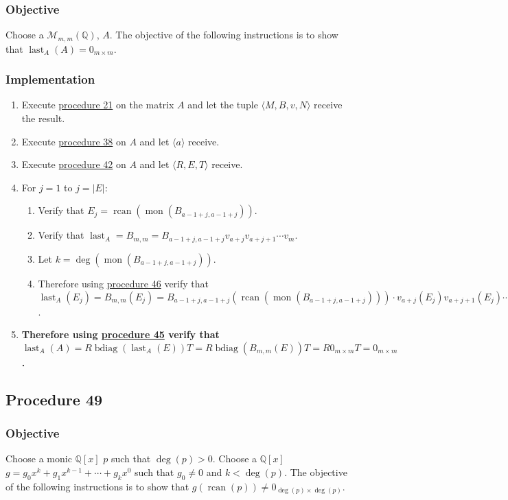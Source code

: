 \documentclass[twocolumn]{article}
\DeclareMathOperator{\bdiag}{bdiag}
\DeclareMathOperator{\rcan}{rcan}
\DeclareMathOperator{\mon}{mon}
\DeclareMathOperator{\last}{last}
\begin{document}
			\subsubsection{Objective}
				Choose a $\mathcal{M}_{m,m}(\mathbb{Q})$, $A$. The objective of the following instructions is to show that $\last_A(A)=0_{m\times m}$.
			\subsubsection{Implementation}
				\begin{enumerate}
					\item Execute \hyperref[sec:procedure 21]{procedure 21} on the matrix $A$ and let the tuple $\langle M,B,v,N\rangle$ receive the result.
					\item Execute \hyperref[sec:procedure 38]{procedure 38} on $A$ and let $\langle a\rangle$ receive.
					\item Execute \hyperref[sec:procedure 42]{procedure 42} on $A$ and let $\langle R,E,T\rangle$ receive.
					\item For $j=1$ to $j=\lvert E\rvert$:
					\begin{enumerate}
						\item Verify that $E_j=\rcan(\mon(B_{a-1+j,a-1+j}))$.
						\item Verify that $\last_A=B_{m,m}=B_{a-1+j,a-1+j}v_{a+j}v_{a+j+1}\cdots v_m$.
						\item Let $k=\deg(\mon(B_{a-1+j,a-1+j}))$.
						\item Therefore using \hyperref[sec:procedure 46]{procedure 46} verify that $\last_A(E_j)=B_{m,m}(E_j)=B_{a-1+j,a-1+j}(\rcan(\mon(B_{a-1+j,a-1+j})))\cdot v_{a+j}(E_j)v_{a+j+1}(E_j)\cdots v_m(E_j)=0_{k\times k}v_{a+j}(E_j)v_{a+j+1}(E_j)\cdots v_m(E_j)=0_{k\times k}$.
					\end{enumerate}
					\item \textbf{Therefore using \hyperref[sec:procedure 45]{procedure 45} verify that $\last_A(A)=R\bdiag(\last_A(E))T=R\bdiag(B_{m,m}(E))T=R0_{m\times m}T=0_{m\times m}$.}
				\end{enumerate}
		\subsection{Procedure 49}\label{sec:procedure 49}
			\subsubsection{Objective}
				Choose a monic $\mathbb{Q}[x]$ $p$ such that $\deg(p)>0$. Choose a $\mathbb{Q}[x]$ $g=g_0x^k+g_1x^{k-1}+\cdots+g_kx^0$ such that $g_0\ne 0$ and $k<\deg(p)$. The objective of the following instructions is to show that $g(\rcan(p))\ne 0_{\deg(p)\times \deg(p)}$.
\end{document}
